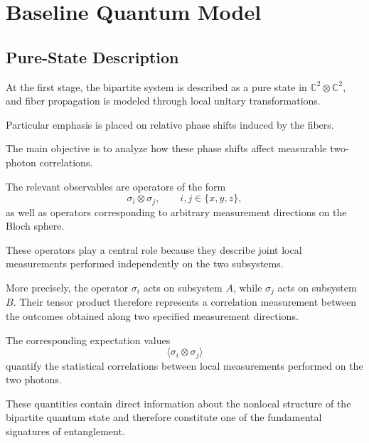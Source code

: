 
\section{Baseline Quantum Model}


\subsection{Pure-State Description}

At the first stage, the bipartite system is described as a pure state in \( \mathbb{C}^2 \otimes \mathbb{C}^2 \), and fiber propagation is modeled through local unitary transformations.

Particular emphasis is placed on relative phase shifts induced by the fibers.

\medskip

The main objective is to analyze how these phase shifts affect measurable two-photon correlations.

The relevant observables are operators of the form
\[
\sigma_i \otimes \sigma_j,
\qquad
i,j \in \{x,y,z\},
\]
as well as operators corresponding to arbitrary measurement directions on the Bloch sphere.

\medskip

These operators play a central role because they describe joint local measurements performed independently on the two subsystems.

More precisely, the operator \( \sigma_i \) acts on subsystem \( A \), while \( \sigma_j \) acts on subsystem \( B \). Their tensor product therefore represents a correlation measurement between the outcomes obtained along two specified measurement directions.

\medskip

The corresponding expectation values
\[
\langle \sigma_i \otimes \sigma_j \rangle
\]
quantify the statistical correlations between local measurements performed on the two photons.

These quantities contain direct information about the nonlocal structure of the bipartite quantum state and therefore constitute one of the fundamental signatures of entanglement.


